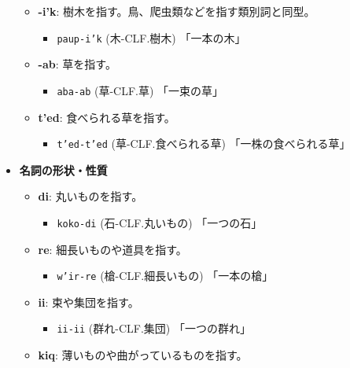 \begin{itemize}
        \begin{itemize}
            \item \textbf{-i'k}: 樹木を指す。鳥、爬虫類などを指す類別詞と同型。
                \begin{itemize}
                    \item \texttt{paup-i'k} (木-CLF.樹木) %
                    \quad 「一本の木」
                \end{itemize}
            \item \textbf{-ab}: 草を指す。
                \begin{itemize}
                    \item \texttt{aba-ab} (草-CLF.草) %
                    \quad 「一束の草」
                \end{itemize}
            \item \textbf{t'ed}: 食べられる草を指す。%
                \begin{itemize}
                    \item \texttt{t'ed-t'ed} (草-CLF.食べられる草) %
                    \quad 「一株の食べられる草」
                \end{itemize}
        \end{itemize}
    \item \textbf{名詞の形状・性質}
        \begin{itemize}
            \item \textbf{di}: 丸いものを指す。
                \begin{itemize}
                    \item \texttt{koko-di} (石-CLF.丸いもの) %
                    \quad 「一つの石」
                \end{itemize}
            \item \textbf{re}: 細長いものや道具を指す。
                \begin{itemize}
                    \item \texttt{w'ir-re} (槍-CLF.細長いもの) %
                    \quad 「一本の槍」
                \end{itemize}
            \item \textbf{ii}: 束や集団を指す。
                \begin{itemize}
                    \item \texttt{ii-ii} (群れ-CLF.集団) %
                    \quad 「一つの群れ」
                \end{itemize}
            \item \textbf{kiq}: 薄いものや曲がっているものを指す。

\end{itemize}
\end{itemize}
